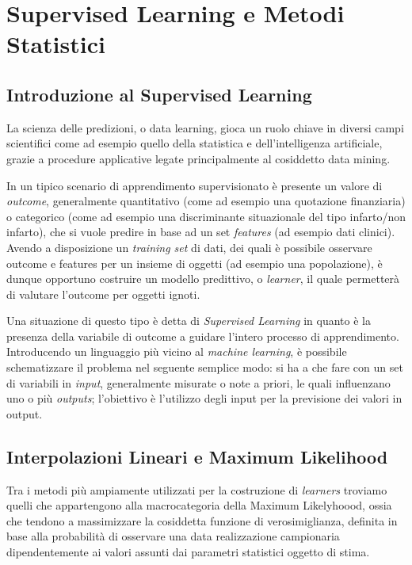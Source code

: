 \documentclass[12pt,openright,twoside,a4paper]{book}
\begin{document}
\tableofcontents
\chapter{Supervised Learning e Metodi Statistici}

\section{Introduzione al Supervised Learning}
La scienza delle predizioni, o data learning, gioca un ruolo chiave in diversi campi scientifici come ad esempio quello della statistica e dell'intelligenza artificiale, grazie a procedure applicative legate principalmente al cosiddetto data mining.

In un tipico scenario di apprendimento supervisionato è presente un valore di \textit{outcome}, generalmente quantitativo (come ad esempio una quotazione finanziaria) o categorico (come ad esempio una discriminante situazionale del tipo infarto/non infarto), che si vuole predire in base ad un set \textit{features} (ad esempio dati clinici).
Avendo a disposizione un \textit{training set} di dati, dei quali è possibile osservare outcome e features per un insieme di oggetti (ad esempio una popolazione), è dunque opportuno costruire un modello predittivo, o \textit{learner}, il quale permetterà di valutare l'outcome per oggetti ignoti.

Una situazione di questo tipo è detta di \textit{Supervised Learning} in quanto è la presenza della variabile di outcome a guidare l'intero processo di apprendimento.
Introducendo un linguaggio più vicino al \textit{machine learning}, è possibile schematizzare il problema nel seguente semplice modo: si ha a che fare con un set di variabili in \textit{input}, generalmente misurate o note a priori, le quali influenzano uno o più \textit{outputs}; l'obiettivo è l'utilizzo degli input per la previsione dei valori in output.

\section{Interpolazioni Lineari e Maximum Likelihood}
Tra i metodi più ampiamente utilizzati per la costruzione di \textit{learners} troviamo quelli che appartengono alla macrocategoria della Maximum Likelyhoood, ossia che tendono a massimizzare la cosiddetta funzione di verosimiglianza, definita in base alla probabilità di osservare una data realizzazione campionaria dipendentemente ai valori assunti dai parametri statistici oggetto di stima.
\end{document}
